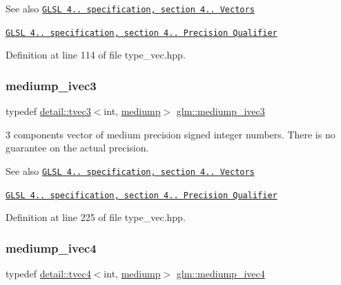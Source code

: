 \begin{DoxySeeAlso}{See also}
\href{http://www.opengl.org/registry/doc/GLSLangSpec.4.20.8.pdf}{\tt G\+L\+SL 4.. specification, section 4.. Vectors} 

\href{http://www.opengl.org/registry/doc/GLSLangSpec.4.20.8.pdf}{\tt G\+L\+SL 4.. specification, section 4.. Precision Qualifier} 
\end{DoxySeeAlso}


Definition at line 114 of file type\+\_\+vec.\+hpp.

\mbox{\label{group__core__precision_ga520d24fa0ea887284b80a02c062ca7b8}} 
\subsubsection{\texorpdfstring{mediump\+\_\+ivec3}{mediump\_ivec3}}
{\footnotesize\ttfamily typedef \hyperlink{structglm_1_1detail_1_1tvec3}{detail\+::tvec3}$<$int, \hyperlink{namespaceglm_a0f04f086094c747d227af4425893f545a6416f3ea0c9025fb21ed50c4d6620482}{mediump}$>$ \hyperlink{group__core__precision_ga520d24fa0ea887284b80a02c062ca7b8}{glm\+::mediump\+\_\+ivec3}}

3 components vector of medium precision signed integer numbers. There is no guarantee on the actual precision.

\begin{DoxySeeAlso}{See also}
\href{http://www.opengl.org/registry/doc/GLSLangSpec.4.20.8.pdf}{\tt G\+L\+SL 4.. specification, section 4.. Vectors} 

\href{http://www.opengl.org/registry/doc/GLSLangSpec.4.20.8.pdf}{\tt G\+L\+SL 4.. specification, section 4.. Precision Qualifier} 
\end{DoxySeeAlso}


Definition at line 225 of file type\+\_\+vec.\+hpp.

\mbox{\label{group__core__precision_gaa4c23a132d76436e041747b0c03265ad}} 
\subsubsection{\texorpdfstring{mediump\+\_\+ivec4}{mediump\_ivec4}}
{\footnotesize\ttfamily typedef \hyperlink{structglm_1_1detail_1_1tvec4}{detail\+::tvec4}$<$int, \hyperlink{namespaceglm_a0f04f086094c747d227af4425893f545a6416f3ea0c9025fb21ed50c4d6620482}{mediump}$>$ \hyperlink{group__core__precision_gaa4c23a132d76436e041747b0c03265ad}{glm\+::mediump\+\_\+ivec4}}

